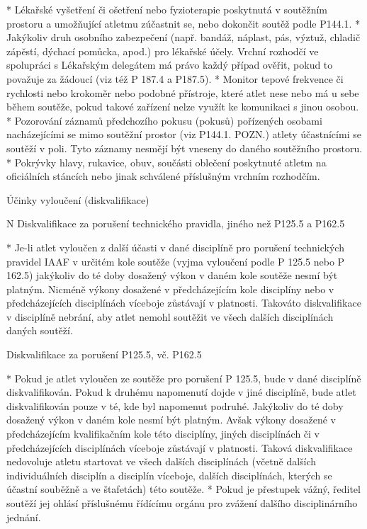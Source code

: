   * Lékařské vyšetření či ošetření nebo fyzioterapie poskytnutá v soutěžním prostoru a umožňující atletmu zúčastnit se, nebo dokončit soutěž podle P144.1.
  * Jakýkoliv druh osobního zabezpečení (např. bandáž, náplast, pás, výztuž, chladič zápěstí, dýchací pomůcka, apod.) pro lékařské účely. Vrchní rozhodčí ve spolupráci s Lékařským delegátem má právo každý případ ověřit, pokud to považuje za žádoucí (viz též P 187.4 a P187.5).
  * Monitor tepové frekvence či rychlosti nebo krokoměr nebo podobné přístroje, které atlet nese nebo má u sebe během soutěže, pokud takové zařízení nelze využít ke komunikaci s jinou osobou.
  * Pozorování záznamů předchozího pokusu (pokusů) pořízených osobami nacházejícími se mimo soutěžní prostor (viz P144.1. POZN.) atlety účastnícími se soutěží v poli. Tyto záznamy nesmějí být vneseny do daného soutěžního prostoru.
  * Pokrývky hlavy, rukavice, obuv, součásti oblečení poskytnuté atletm na oficiálních stáncích nebo jinak schválené příslušným vrchním rozhodčím.
  \enditems
\enditems

\secc Účinky vyloučení (diskvalifikace)

\begitems \style N
Diskvalifikace za porušení technického pravidla‚ jiného než P125.5 a P162.5

* Je-li atlet vyloučen z další účasti v dané disciplíně pro porušení technických pravidel IAAF v určitém kole soutěže (vyjma vyloučení podle P 125.5 nebo P 162.5) jakýkoliv do té doby dosažený výkon v daném kole soutěže nesmí být platným. Nicméně výkony dosažené v předcházejícím kole disciplíny nebo v předcházejících disciplínách víceboje zůstávají v platnosti. Takováto diskvalifikace v disciplíně nebrání, aby atlet nemohl soutěžit ve všech dalších disciplínách daných soutěží.

Diskvalifikace za porušení P125.5, vč. P162.5

* Pokud je atlet vyloučen ze soutěže pro porušení P 125.5, bude v dané disciplíně diskvalifikován. Pokud k druhému napomenutí dojde v jiné disciplíně, bude atlet diskvalifikován pouze v té, kde byl napomenut podruhé. Jakýkoliv do té doby dosažený výkon v daném kole nesmí být platným. Avšak výkony dosažené v předcházejícím kvalifikačním kole této disciplíny, jiných disciplínách či v předcházejících disciplínách víceboje zůstávají v platnosti. Taková diskvalifikace nedovoluje atletu startovat ve všech dalších disciplínách (včetně dalších individuálních disciplín a disciplín víceboje, dalších disciplínách, kterých se účastní souběžně a ve štafetách) této soutěže.
* Pokud je přestupek vážný, ředitel soutěží jej ohlásí příslušnému řídícímu orgánu pro zvážení dalšího disciplinárního jednání.

